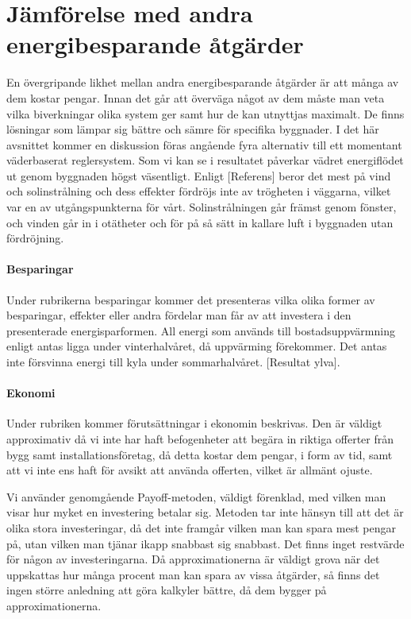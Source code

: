 \section{Jämförelse med andra energibesparande åtgärder}

En övergripande likhet mellan andra energibesparande åtgärder är att många av dem kostar pengar. Innan det går att överväga något av dem måste man veta vilka biverkningar olika system ger samt hur de kan utnyttjas maximalt. De finns lösningar som lämpar sig bättre och sämre för specifika byggnader. I det här avsnittet kommer en diskussion föras angående fyra alternativ till ett momentant väderbaserat reglersystem.
Som vi kan se i resultatet påverkar vädret energiflödet ut genom byggnaden högst väsentligt. Enligt [Referens] beror det mest på vind och solinstrålning och dess effekter fördröjs inte av trögheten i väggarna, vilket var en av utgångspunkterna för vårt. Solinstrålningen går främst genom fönster, och vinden går in i otätheter och för på så sätt in kallare luft i byggnaden utan fördröjning.

\paragraph{Besparingar}
Under rubrikerna besparingar kommer det presenteras vilka olika former av besparingar, effekter eller andra fördelar man får av att investera i den presenterade energisparformen. All energi som används till bostadsuppvärmning enligt \cite{energideklaration} antas ligga under vinterhalvåret, då uppvärming förekommer. Det antas inte försvinna energi till kyla under sommarhalvåret.  [Resultat ylva].

\paragraph{Ekonomi}
Under rubriken kommer förutsättningar i ekonomin beskrivas. Den är väldigt approximativ då vi inte har haft befogenheter att begära in riktiga offerter från bygg samt installationsföretag, då detta kostar dem pengar, i form av tid, samt att vi inte ens haft för avsikt att använda offerten, vilket är allmänt ojuste.

Vi använder genomgående Payoff-metoden, väldigt förenklad, med vilken man visar hur myket en investering betalar sig. Metoden tar inte hänsyn till att det är olika stora investeringar, då det inte framgår vilken man kan spara mest pengar på, utan vilken man tjänar ikapp snabbast sig snabbast. Det finns inget restvärde för någon av investeringarna. Då approximationerna är väldigt grova när det uppskattas hur många procent man kan spara av vissa åtgärder, så finns det ingen större anledning att göra kalkyler bättre, då dem bygger på approximationerna.

